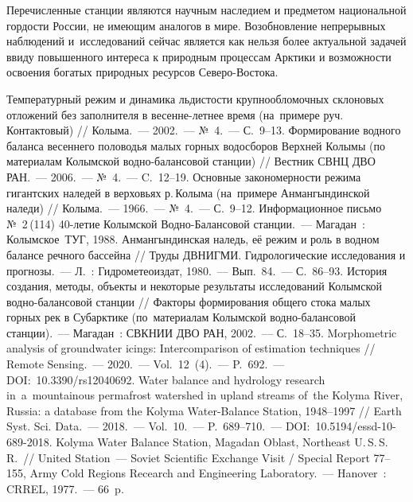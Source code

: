 Перечисленные станции являются научным наследием и предметом национальной гордости России, не имеющим аналогов в мире. Возобновление непрерывных наблюдений и~исследований сейчас является как нельзя более актуальной задачей ввиду повышенного интереса к природным процессам Арктики и возможности освоения богатых природных ресурсов Северо-Востока.

\begin{thebibliography}{99}
\bibitem{} Температурный режим и динамика льдистости крупнообломочных склоновых отложений без заполнителя в весенне-летнее время (на~примере руч. Контактовый) // Колыма.~--- 2002.~--- №~4.~--- С.~9--13.
\bibitem{} Формирование водного баланса весеннего половодья малых горных водосборов Верхней Колымы (по материалам Колымской водно-балансовой станции) // Вестник СВНЦ ДВО РАН.~--- 2006.~--- №~4.~--- C.~12--19.
\bibitem{} Основные закономерности режима гигантских наледей в верховьях р.\,Колыма (на~примере Анмангындинской наледи) // Колыма.~--- 1966.~--- №~4.~--- С.~9--12.
\bibitem{}Информационное письмо №~2\,(114) 40-летие Колымской Водно-Балансовой станции.~--- Магадан~:  Колымское~ТУГ, 1988.
\bibitem{} Анмангындинская наледь, её режим и роль в водном балансе речного бассейна // Труды ДВНИГМИ. Гидрологические исследования и прогнозы.~--- Л.~: Гидрометеоиздат, 1980.~--- Вып.~84.~--- С.~86--93.
\bibitem{} История создания, методы, объекты и некоторые результаты исследований Колымской водно-балансовой станции // Факторы формирования общего стока малых горных рек в Субарктике (по~материалам Колымской водно-балансовой станции).~--- Магадан~: СВКНИИ ДВО РАН, 2002.~--- С.~18--35.
\bibitem{} Morphometric analysis of groundwater icings: Intercomparison of estimation techniques // Remote Sensing.~--- 2020.~--- Vol.~12~(4).~--- P.~692.~--- DOI:~10.3390/rs12040692.
\bibitem{} Water balance and hydrology research in~a~mountainous permafrost watershed in upland streams of~the Kolyma River, Russia: a database from the Kolyma Water-Balance Station, 1948–1997 // Earth Syst. Sci. Data.~--- 2018.~--- Vol.~10.~--- P.~689--710.~--- DOI:~10.5194/essd-10-689-2018.
\bibitem{} Kolyma Water Balance Station, Magadan Oblast, Northeast U.\,S.\,S.\,R.~// United Station~--- Soviet Scientific Exchange Visit / Special Report 77--155, Army Cold Regions Recearch and Engineering Laboratory.~--- Hanover~: CRREL, 1977.~--- 66~p.
\end{thebibliography}

